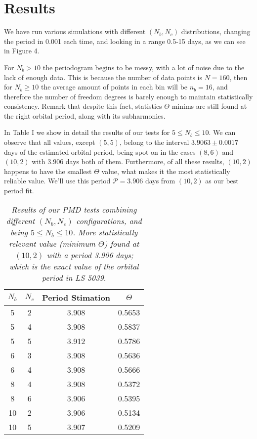\documentclass[twocolumn]{revtex4}
\begin{document}
\section{Results}

We have run various simulations with different $(N_b, N_c)$ distributions, changing the period in 0.001 each time, and looking in a range 0.5-15 days, as we can see in Figure 4.

For $N_b > 10$ the periodogram begins to be messy, with a lot of noise due to the lack of enough data. This is because the number of data points is $N=160$, then for $N_b \geq 10$ the average amount of points in each bin will be $n_b = 16$, and therefore the number of freedom degrees is barely enough to maintain statistically consistency. Remark that despite this fact, statistics $\Theta$ minims are still found at the right orbital period, along with its subharmonics.

In Table I we show in detail the results of our tests for $5 \leq N_b \leq 10$. We can observe that all values, except $(5,5)$, belong to the interval $3.9063 \pm 0.0017$ days of the estimated orbital period, being spot on in the cases $(8,6)$ and $(10,2)$ with $3.906$ days both of them. Furthermore, of all these results, $(10,2)$ happens to have the smallest $\Theta$ value, what makes it the most statistically reliable value. We'll use this period $\mathcal{P}=3.906$ days from $(10,2)$ as our best period fit.


\begin{table}[t]
\centering
\begin{tabular}{cccc}
  \hline
$N_b$ & $N_c$ & Period Stimation & $\Theta$ \\ 
  \hline
5 & 2 & 3.908 & 0.5653 \\ 
  5 & 4 & 3.908 & 0.5837 \\ 
  5 & 5 & 3.912 & 0.5786 \\ 
  6 & 3 & 3.908 & 0.5636 \\ 
  6 & 4 & 3.908 & 0.5666 \\ 
  8 & 4 & 3.908 & 0.5372 \\ 
  8 & 6 & 3.906 & 0.5395 \\ 
  10 & 2 & 3.906 & 0.5134 \\ 
  10 & 5 & 3.907 & 0.5209 \\ 
   \hline
	\end{tabular}
\caption{\textit{Results of our PMD tests combining different $(N_b, N_c)$ configurations, and being $5 \leq N_b \leq 10$. More statistically relevant value (minimum $\Theta$) found at $(10,2)$ with a period 3.906 days; which is the exact value of the orbital period in LS 5039.}} 
\end{table}
\end{document}
